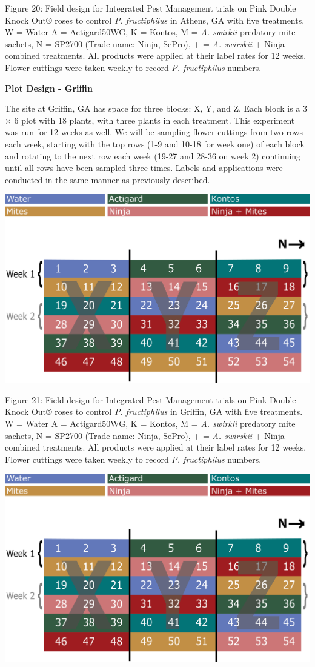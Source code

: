 \documentclass[12pt,final,CPage]{ufthesis}
\begin{document}
{  Figure 20: Field design for Integrated Pest Management trials on Pink Double Knock Out® roses to control \emph{P. fructiphilus} in Athens, GA with five treatments. W = Water A = Actigard50WG, K = Kontos, M = \emph{A. swirkii} predatory mite sachets, N = SP2700 (Trade name: Ninja, SePro), + = \emph{A. swirskii} + Ninja combined treatments. All products were applied at their label rates for 12 weeks. Flower cuttings were taken weekly to record \emph{P. fructiphilus} numbers.

  \textbf{Plot Design - Griffin}

  The site at Griffin, GA has space for three blocks: X, Y, and Z. Each block is a 3 \(\times\) 6 plot with 18 plants, with three plants in each treatment. This experiment was run for 12 weeks as well. We will be sampling flower cuttings from two rows each week, starting with the top rows (1-9 and 10-18 for week one) of each block and rotating to the next row each week (19-27 and 28-36 on week 2) continuing until all rows have been sampled three times. Labels and applications were conducted in the same manner as previously described.
  \begin{center}\includegraphics[width=0.8\linewidth]{figure/rrv_ipm_plot_map_2019_griffin} \end{center}

  Figure 21: Field design for Integrated Pest Management trials on Pink Double Knock Out® roses to control \emph{P. fructiphilus} in Griffin, GA with five treatments. W = Water A = Actigard50WG, K = Kontos, M = \emph{A. swirkii} predatory mite sachets, N = SP2700 (Trade name: Ninja, SePro), + = \emph{A. swirskii} + Ninja combined treatments. All products were applied at their label rates for 12 weeks. Flower cuttings were taken weekly to record \emph{P. fructiphilus} numbers.
  \begin{center}\includegraphics[width=0.8\linewidth]{figure/rrv_ipm_plot_map_2019_griffin} \end{center}

}
\end{document}
